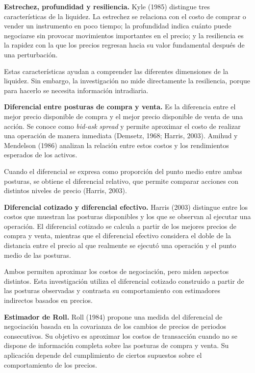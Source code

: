\textbf{Estrechez, profundidad y resiliencia.} Kyle (1985) distingue tres características de la liquidez. La estrechez se relaciona con el costo de comprar o vender un instrumento en poco tiempo; la profundidad indica cuánto puede negociarse sin provocar movimientos importantes en el precio; y la resiliencia es la rapidez con la que los precios regresan hacia su valor fundamental después de una perturbación.

Estas características ayudan a comprender las diferentes dimensiones de la liquidez. Sin embargo, la investigación no mide directamente la resiliencia, porque para hacerlo se necesita información intradiaria.

\textbf{Diferencial entre posturas de compra y venta.} Es la diferencia entre el mejor precio disponible de compra y el mejor precio disponible de venta de una acción. Se conoce como \emph{bid-ask spread} y permite aproximar el costo de realizar una operación de manera inmediata (Demsetz, 1968; Harris, 2003). Amihud y Mendelson (1986) analizan la relación entre estos costos y los rendimientos esperados de los activos.

Cuando el diferencial se expresa como proporción del punto medio entre ambas posturas, se obtiene el diferencial relativo, que permite comparar acciones con distintos niveles de precio (Harris, 2003).

\textbf{Diferencial cotizado y diferencial efectivo.} Harris (2003) distingue entre los costos que muestran las posturas disponibles y los que se observan al ejecutar una operación. El diferencial cotizado se calcula a partir de los mejores precios de compra y venta, mientras que el diferencial efectivo considera el doble de la distancia entre el precio al que realmente se ejecutó una operación y el punto medio de las posturas.

Ambos permiten aproximar los costos de negociación, pero miden aspectos distintos. Esta investigación utiliza el diferencial cotizado construido a partir de las posturas observadas y contrasta su comportamiento con estimadores indirectos basados en precios.

\textbf{Estimador de Roll.} Roll (1984) propone una medida del diferencial de negociación basada en la covarianza de los cambios de precios de periodos consecutivos. Su objetivo es aproximar los costos de transacción cuando no se dispone de información completa sobre las posturas de compra y venta. Su aplicación depende del cumplimiento de ciertos supuestos sobre el comportamiento de los precios.

